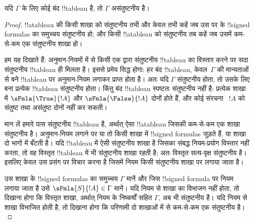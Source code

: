 \documentclass[../../../include/open-logic-section]{subfiles}
\begin{document}
\begin{thm}[सुदृढ़ता]
  यदि $\Gamma$ के लिए कोई बंद !!{tableau} है, तो $\Gamma$ असंतुष्टनीय है।
\end{thm}

\begin{proof}
!!a{tableau} की किसी शाखा को संतुष्टनीय तभी और केवल तभी कहें जब उस पर के
!!{signed formula}s का समुच्चय संतुष्टनीय हो; और किसी !!a{tableau} को
संतुष्टनीय तब कहें जब उसमें कम-से-कम एक संतुष्टनीय शाखा हो।

हम यह दिखाते हैं: अनुमान-नियमों में से किसी एक द्वारा संतुष्टनीय
!!{tableau} का विस्तार करने पर सदा संतुष्टनीय !!{tableau} ही मिलता है। इससे
प्रमेय सिद्ध होगा: हर बंद !!{tableau}, केवल~$\Gamma$ की मान्यताओं से बने
!!{tableau} पर अनुमान-नियम लगाकर प्राप्त होता है। अतः यदि $\Gamma$
संतुष्टनीय होता, तो उसके लिए बना प्रत्येक !!{tableau} संतुष्टनीय होता। किंतु
बंद !!{tableau} स्पष्टतः संतुष्टनीय नहीं है: प्रत्येक शाखा में
$\sFmla{\True}{!A}$ और $\sFmla{\False}{!A}$ दोनों होते हैं, और कोई संरचना
~$!A$ को संतुष्ट तथा असंतुष्ट दोनों नहीं कर सकती।

मान लें हमारे पास संतुष्टनीय !!{tableau} है, अर्थात् ऐसा !!a{tableau} जिसकी
कम-से-कम एक शाखा संतुष्टनीय है। अनुमान-नियम लगाने पर या तो किसी शाखा में
!!{signed formula}s जुड़ते हैं, या शाखा दो भागों में बँटती है। यदि
!!{tableau} में ऐसी संतुष्टनीय शाखा है जिसका संबद्ध नियम-प्रयोग विस्तार नहीं
करता, तो वह विस्तृत !!{tableau} में भी संतुष्टनीय शाखा रहती है; अतः विस्तृत
सत्य-वृक्ष संतुष्टनीय है। इसलिए केवल उस प्रसंग पर विचार करना है जिसमें नियम
किसी संतुष्टनीय शाखा पर लगाया जाता है।

उस शाखा के !!{signed formula}s का समुच्चय $\Gamma$ मानें और जिस
!!{signed formula} पर नियम लगाया जाता है उसे
$\sFmla{S}{!A} \in \Gamma$ मानें। यदि नियम से शाखा का विभाजन नहीं होता, तो
दिखाना होगा कि विस्तृत शाखा, अर्थात् नियम के निष्कर्षों सहित $\Gamma$, अब भी
संतुष्टनीय है। यदि नियम से शाखा विभाजित होती है, तो दिखाना होगा कि परिणामी
दो शाखाओं में से कम-से-कम एक संतुष्टनीय है।
  

\end{proof}
\end{document}
